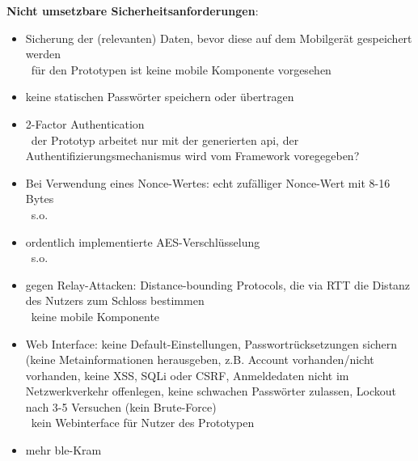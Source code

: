     \medskip
    \noindent \textbf{Nicht umsetzbare Sicherheitsanforderungen}:
    \begin{itemize}[noitemsep]
        \item Sicherung der (relevanten) Daten, bevor diese auf dem Mobilgerät gespeichert werden\cite{Ye2017}\\
            \textrightarrow\ für den Prototypen ist keine mobile Komponente vorgesehen
        \item keine statischen Passwörter speichern oder übertragen\cite{Rose2016}
        \item 2-Factor Authentication\cite{Rose2016,Miessler2015}\\
            \textrightarrow\ der Prototyp arbeitet nur mit der generierten \gls{api}, der Authentifizierungsmechanismus wird vom Framework voregegeben?
        \item Bei Verwendung eines Nonce-Wertes: echt zufälliger Nonce-Wert mit 8-16 Bytes\cite{Rose2016}\\
            \textrightarrow\ s.o.
        \item ordentlich implementierte AES-Verschlüsselung\cite{Rose2016}\\
            \textrightarrow\ s.o.
        \item gegen Relay-Attacken: Distance-bounding Protocols, die via RTT die Distanz des Nutzers zum Schloss bestimmen\cite{Ho2016}\\ 
            \textrightarrow\ keine mobile Komponente
        \item Web Interface: keine Default-Einstellungen, Passwortrücksetzungen sichern (keine Metainformationen herausgeben, z.B. Account vorhanden/\-nicht vorhanden, keine XSS, SQLi oder CSRF, Anmeldedaten nicht im Netzwerkverkehr offenlegen, keine schwachen Passwörter zulassen, Lockout nach 3-5 Versuchen (kein Brute-Force)\cite{Miessler2015}\\
            \textrightarrow\ kein Webinterface für Nutzer des Prototypen
        \item mehr \gls{ble}-Kram 
    \end{itemize}
    
